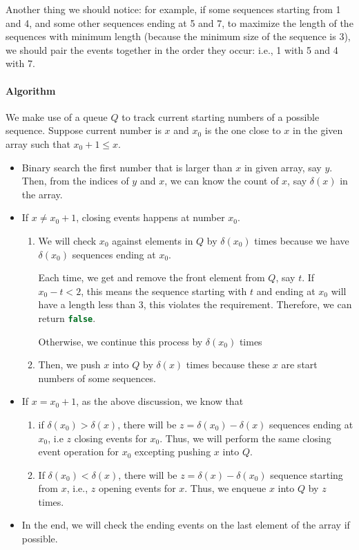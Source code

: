 Another thing we should notice: for example, if some sequences starting from 1 and 4, and some other sequences ending at 5 and 7, to maximize the length of the sequences with minimum length (because the minimum size of the sequence is 3), we should pair the events together in the order they occur: i.e., 1 with 5 and 4 with 7.

\paragraph{Algorithm}

We make use of a queue $Q$ to track current starting numbers of a possible sequence. Suppose current number is $x$ and $x_0$ is the one close to $x$ in the given array such that $x_0+1\leq x$. 

\begin{itemize}
\item Binary search the first number that is larger than $x$ in given array, say $y$. Then, from the indices of $y$ and $x$, we can know the count of $x$, say $\delta(x)$ in the array.
\item If $x\neq x_0+1$, closing events happens at number $x_0$. 
\begin{enumerate}
\item We will check $x_0$ against elements in $Q$ by $\delta(x_0)$ times because we have $\delta(x_0)$ sequences ending at $x_0$. 

Each time, we get and remove the front element from $Q$, say $t$. If $x_0 -t < 2$, this means the sequence starting with $t$ and ending at $x_0$ will have a length less than 3, this violates the requirement. Therefore, we can return \lstinline[language=C++, basicstyle=\small\ttfamily, keywordstyle=\bfseries\color{green!40!black}]|false|.

Otherwise, we continue this process by $\delta(x_0)$ times
\item Then, we push $x$ into $Q$ by $\delta(x)$ times because these $x$ are start numbers of some sequences.
\end{enumerate}
\item If $x=x_0+1$, as the above discussion, we know that
\begin{enumerate}
\item if $\delta(x_0) > \delta(x)$, there will be $z=\delta(x_0)-\delta(x)$ sequences ending at $x_0$, i.e $z$ closing events for $x_0$. Thus, we will perform the same closing event operation for $x_0$ excepting pushing $x$ into $Q$.
\item If $\delta(x_0)<\delta(x)$, there will be $z=\delta(x)-\delta(x_0)$ sequence starting from $x$, i.e., $z$ opening events for $x$. Thus, we enqueue $x$ into $Q$ by $z$ times.
\end{enumerate}
\item In the end, we will check the ending events on the last element of the array if possible.
\end{itemize}

